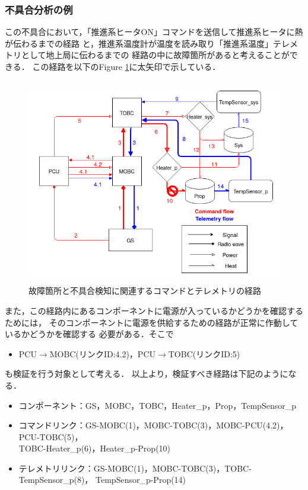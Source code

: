 \documentclass[11pt]{article}
\begin{document}
\subsubsection{不具合分析の例}
この不具合において，「推進系ヒータON」コマンドを送信して推進系ヒータに熱が伝わるまでの経路
と，推進系温度計が温度を読み取り「推進系温度」テレメトリとして地上局に伝わるまでの
経路の中に故障箇所があると考えることができる．
この経路を以下のFigure \ref{fig:simple_sat_fault}に太矢印で示している．
\begin{figure}[H]
   \centering
      \includegraphics[height=9.0cm]{figure/simple_sat_fault.png}
      \caption{故障箇所と不具合検知に関連するコマンドとテレメトリの経路}
      \label{fig:simple_sat_fault}
\end{figure}
また，この経路内にあるコンポーネントに電源が入っているかどうかを確認するためには，
そのコンポーネントに電源を供給するための経路が正常に作動しているかどうかを確認する
必要がある．そこで
\begin{itemize}
   \item PCU$\rightarrow$MOBC(リンクID:4.2)，PCU$\rightarrow$TOBC(リンクID:5)
\end{itemize}
も検証を行う対象として考える．
以上より，検証すべき経路は下記のようになる．
\begin{itemize}
   \item コンポーネント：GS，MOBC，TOBC，Heater\_p，Prop，TempSensor\_p
   \item コマンドリンク：GS-MOBC(1)，MOBC-TOBC(3)，MOBC-PCU(4.2)，
   PCU-TOBC(5)，\\TOBC-Heater\_p(6)，Heater\_p-Prop(10)
   \item テレメトリリンク：GS-MOBC(1)，MOBC-TOBC(3)，TOBC-TempSensor\_p(8)，
   TempSensor\_p-Prop(14)
\end{itemize}
\end{document}
